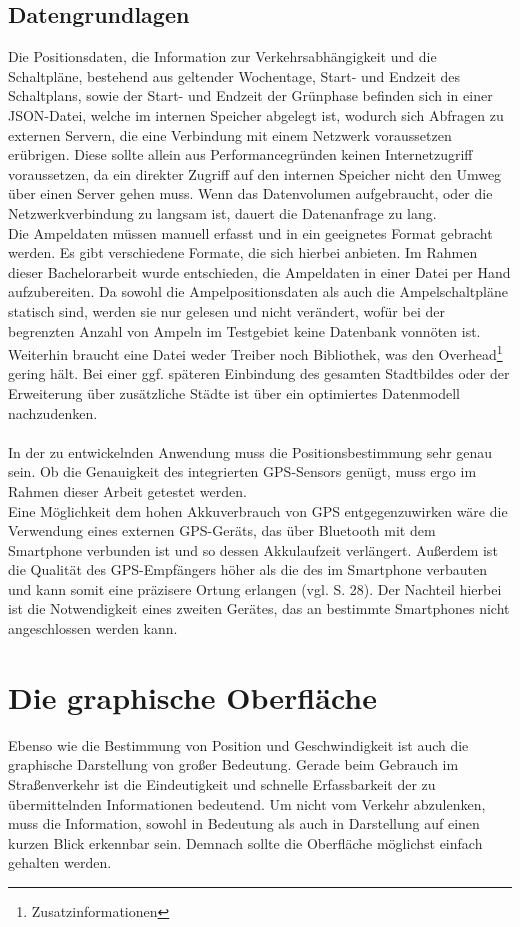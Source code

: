 \subsection{Datengrundlagen}
Die Positionsdaten, die Information zur Verkehrsabhängigkeit und die Schaltpläne, bestehend aus geltender Wochentage, Start- und Endzeit des Schaltplans, sowie der Start- und Endzeit der Grünphase befinden sich in einer \gls{JSON}-Datei, welche im internen Speicher abgelegt ist, wodurch sich Abfragen zu externen Servern, die eine Verbindung mit einem Netzwerk voraussetzen erübrigen. Diese sollte allein aus Performancegründen keinen Internetzugriff voraussetzen, da ein direkter Zugriff auf den internen Speicher nicht den Umweg über einen Server gehen muss. Wenn das Datenvolumen aufgebraucht, oder die Netzwerkverbindung zu langsam ist, dauert die Datenanfrage zu lang.\\
Die Ampeldaten müssen manuell erfasst und in ein geeignetes Format gebracht werden. Es gibt verschiedene Formate, die sich hierbei anbieten. Im Rahmen dieser Bachelorarbeit wurde entschieden, die Ampeldaten in einer Datei per Hand aufzubereiten. Da sowohl die Ampelpositionsdaten als auch die Ampelschaltpläne statisch sind, werden sie nur gelesen und nicht verändert, wofür bei der begrenzten Anzahl von Ampeln im Testgebiet keine Datenbank vonnöten ist. Weiterhin braucht eine Datei weder Treiber noch Bibliothek, was den Overhead\footnote{ Zusatzinformationen} gering hält. 
Bei einer ggf. späteren Einbindung des gesamten Stadtbildes oder der Erweiterung über zusätzliche Städte ist über ein optimiertes Datenmodell nachzudenken. \\\\
In der zu entwickelnden Anwendung muss die Positionsbestimmung sehr genau sein. Ob die Genauigkeit des integrierten \gls{GPS}-Sensors genügt, muss ergo im Rahmen dieser Arbeit getestet werden. \\
Eine Möglichkeit dem hohen Akkuverbrauch von \gls{GPS} entgegenzuwirken wäre die Verwendung eines externen \gls{GPS}-Geräts, das über Bluetooth mit dem \gls{Smartphone} verbunden ist und so dessen Akkulaufzeit verlängert. Außerdem ist die Qualität des \gls{GPS}-Empfängers höher als die des im \gls{Smartphone} verbauten und kann somit eine präzisere Ortung erlangen (vgl. \cite{gps} S. 28). Der Nachteil hierbei ist die Notwendigkeit eines zweiten Gerätes, das an bestimmte Smartphones nicht angeschlossen werden kann. 
\section{Die graphische Oberfläche}
Ebenso wie die Bestimmung von Position und Geschwindigkeit ist auch die graphische Darstellung von großer Bedeutung. Gerade beim Gebrauch im Straßenverkehr ist die Eindeutigkeit und schnelle Erfassbarkeit der zu übermittelnden Informationen bedeutend. Um nicht vom Verkehr abzulenken, muss die Information, sowohl in Bedeutung als auch in Darstellung auf einen kurzen Blick erkennbar sein. Demnach sollte die Oberfläche möglichst einfach gehalten werden.
